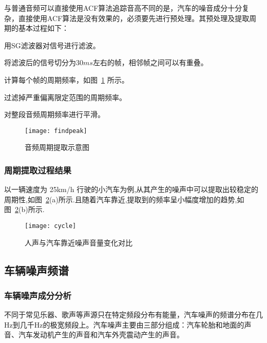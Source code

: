 与普通音频可以直接使用ACF算法追踪音高不同的是，汽车的噪音成分十分复杂，直接使用ACF算法是没有效果的，必须要先进行预处理。其预处理及提取周期的基本过程如下：

\begin{compactenum}
\item 用SG滤波器对信号进行滤波。

\item 将滤波后的信号切分为$30ms$左右的帧，相邻帧之间可以有重叠。

\item 计算每个帧的周期频率，如图~\ref{fig:findpeak} 所示。

\item 过滤掉严重偏离限定范围的周期频率。

\item 对整段音频周期频率进行平滑。

\end{compactenum}

\begin{figure}[htbp] %
  \centering
  \texttt{[image: findpeak]}
  \caption{音频周期提取示意图}
  \label{fig:findpeak}
\end{figure}



\subsubsection{周期提取过程结果}

以一辆速度为 25km/h 行驶的小汽车为例,从其产生的噪声中可以提取出较稳定的周期性,如图~\ref{fig:cycle}(a)所示.且随着汽车靠近,提取到的频率呈小幅度增加的趋势,如图~\ref{fig:cycle}(b)所示. 

\begin{figure}[htbp] %
  \centering
  \texttt{[image: cycle]}
  \caption[音量变化特性对比]{人声与汽车靠近噪声音量变化对比}
  \label{fig:cycle}
\end{figure}



\subsection{车辆噪声频谱}

\subsubsection{车辆噪声成分分析}
不同于常见乐器、歌声等声源只在特定频段分布有能量，汽车噪声的频谱分布在几Hz到几千Hz的极宽频段上。汽车噪声主要由三部分组成：汽车轮胎和地面的声音、汽车发动机产生的声音和汽车外壳震动产生的声音。

